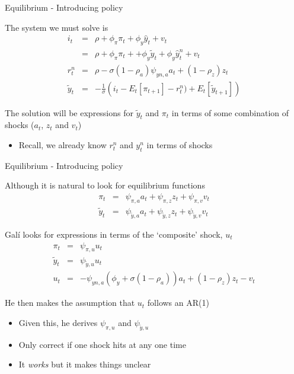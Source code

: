 \documentclass{beamer}
\begin{document}

	
\begin{frame}{Equilibrium - Introducing policy}

The system we must solve is
\begin{eqnarray*}
i_{t} 		&=& \rho + \phi_{\pi} \pi_{t} + \phi_{y} \hat{y}_{t} + v_{t} 		\\
			&=& \rho + \phi_{\pi} \pi_{t} + + \phi_{y} \tilde{y}_{t} + \phi_{y} \hat{y}^{n}_{t} + v_{t} 		\\
r^{n}_{t}	&=& \rho - \sigma(1-\rho_{a})\psi_{yn,a}a_{t} + (1-\rho_{z})z_{t}	\\
\tilde{y}_{t} &=& -\frac{1}{\sigma} \left( i_{t} - E_{t}[\pi_{t+1}] - r^{n}_{t}) + E_{t}[ \tilde{y}_{t+1} ] \right)
\end{eqnarray*}

The solution will be expressions for $\tilde{y}_{t}$ and $\pi_{t}$ in terms of some combination of shocks ($a_{t}$, $z_{t}$ and $v_{t}$)
\begin{itemize}
\item	Recall, we already know $r^{n}_{t}$ and $y^{n}_{t}$ in terms of shocks
\end{itemize}

\end{frame}


	
\begin{frame}{Equilibrium - Introducing policy}

Although it is natural to look for equilibrium functions
\begin{eqnarray*}
\pi_{t} 		&=& \psi_{\pi,a} a_{t} + \psi_{\pi,z} z_{t} + \psi_{\pi,v} v_{t} \\
\tilde{y}_{t} &=& \psi_{\tilde{y},a} a_{t} + \psi_{\tilde{y},z} z_{t} + \psi_{\tilde{y},v} v_{t}
\end{eqnarray*}

Gal\'i looks for expressions in terms of the `composite' shock, $u_{t}$
\begin{eqnarray*}
\pi_{t} 		&=& \psi_{\pi,u} u_{t} \\
\tilde{y}_{t} &=& \psi_{\tilde{y},u} u_{t} \\
u_{t}		&=& -\psi_{yn,a}\left( \phi_{y} + \sigma(1-\rho_{a}) \right)a_{t} + (1-\rho_{z})z_{t} - v_{t}
\end{eqnarray*}

He then makes the assumption that $u_{t}$ follows an AR(1)
\begin{itemize}
\item	Given this, he derives $\psi_{\pi,u}$ and $\psi_{\tilde{y},u}$
\item	Only correct if one shock hits at any one time
\item	It \emph{works} but it makes things unclear
\end{itemize}

\end{frame}
\end{document}
